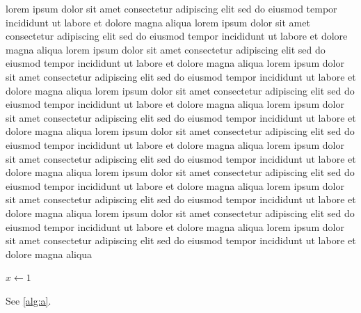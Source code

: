 \documentclass{article}
\begin{document}
lorem ipsum dolor sit amet consectetur adipiscing elit sed do eiusmod tempor incididunt ut labore et dolore magna aliqua lorem ipsum dolor sit amet consectetur adipiscing elit sed do eiusmod tempor incididunt ut labore et dolore magna aliqua lorem ipsum dolor sit amet consectetur adipiscing elit sed do eiusmod tempor incididunt ut labore et dolore magna aliqua lorem ipsum dolor sit amet consectetur adipiscing elit sed do eiusmod tempor incididunt ut labore et dolore magna aliqua lorem ipsum dolor sit amet consectetur adipiscing elit sed do eiusmod tempor incididunt ut labore et dolore magna aliqua lorem ipsum dolor sit amet consectetur adipiscing elit sed do eiusmod tempor incididunt ut labore et dolore magna aliqua lorem ipsum dolor sit amet consectetur adipiscing elit sed do eiusmod tempor incididunt ut labore et dolore magna aliqua lorem ipsum dolor sit amet consectetur adipiscing elit sed do eiusmod tempor incididunt ut labore et dolore magna aliqua lorem ipsum dolor sit amet consectetur adipiscing elit sed do eiusmod tempor incididunt ut labore et dolore magna aliqua lorem ipsum dolor sit amet consectetur adipiscing elit sed do eiusmod tempor incididunt ut labore et dolore magna aliqua lorem ipsum dolor sit amet consectetur adipiscing elit sed do eiusmod tempor incididunt ut labore et dolore magna aliqua lorem ipsum dolor sit amet consectetur adipiscing elit sed do eiusmod tempor incididunt ut labore et dolore magna aliqua
\begin{algorithm}[H]
\caption{Here}
\label{alg:a}
\begin{algorithmic}
\State $x \gets 1$
\end{algorithmic}
\end{algorithm}
See \cref{alg:a}.
\end{document}
